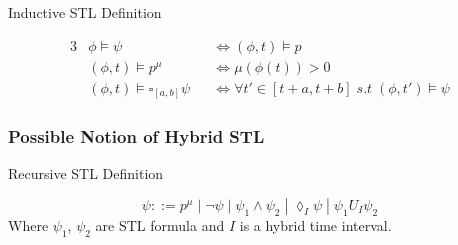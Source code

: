 \documentclass{article}
\theoremstyle{definition}
\newtheorem{definition}{Definition}[section]
\begin{document}
\begin{center}
    Inductive STL Definition
\end{center}
\begin{alignat*}{3}
            &\phi \models \psi &&\Leftrightarrow (\phi, t) \models p \\
            &(\phi, t) \models p^\mu \quad &&\Leftrightarrow \mu(\phi(t))
> 0\\
            &(\phi, t) \models \square_{[a,b]} \psi &&\Leftrightarrow
\forall t' \in [t + a, t + b]\;s.t\;(\phi, t') \models \psi
\end{alignat*}

\clearpage


\subsubsection{Possible Notion of Hybrid STL}
\begin{center}
    Recursive STL Definition
\end{center}
\begin{equation}
    \psi ::= p^\mu\;|\;\lnot \psi\;|\;\psi_1 \land \psi_2\;|\;\lozenge_{I} \psi\;|\;\psi_1 U_{I} \psi_2
\end{equation}
Where $\psi_1$, $\psi_2$ are STL formula and $I$ is a hybrid time interval.
\end{document}
